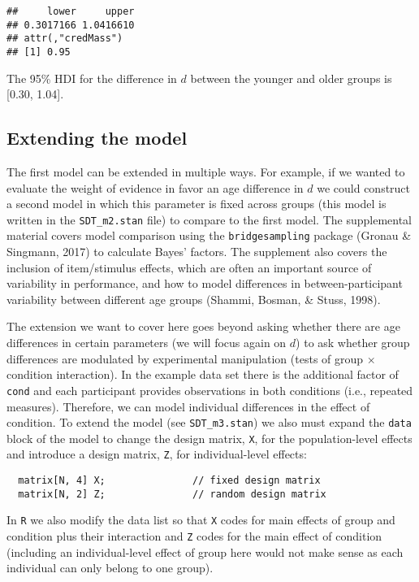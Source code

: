 \documentclass[
  english,
  ,man,floatsintext]{apa6}
\begin{document}
\begin{verbatim}
##     lower     upper 
## 0.3017166 1.0416610 
## attr(,"credMass")
## [1] 0.95
\end{verbatim}

The 95\% HDI for the difference in \(d\) between the younger and older groups is {[}0.30, 1.04{]}.

\hypertarget{extending-the-model}{%
\subsection{Extending the model}\label{extending-the-model}}

The first model can be extended in multiple ways. For example, if we wanted to evaluate the weight of evidence in favor an age difference in \(d\) we could construct a second model in which this parameter is fixed across groups (this model is written in the \texttt{SDT\_m2.stan} file) to compare to the first model. The supplemental material covers model comparison using the \texttt{bridgesampling} package (Gronau \& Singmann, 2017) to calculate Bayes' factors. The supplement also covers the inclusion of item/stimulus effects, which are often an important source of variability in performance, and how to model differences in between-participant variability between different age groups (Shammi, Bosman, \& Stuss, 1998).

The extension we want to cover here goes beyond asking whether there are age differences in certain parameters (we will focus again on \(d\)) to ask whether group differences are modulated by experimental manipulation (tests of group \(\times\) condition interaction). In the example data set there is the additional factor of \texttt{cond} and each participant provides observations in both conditions (i.e., repeated measures). Therefore, we can model individual differences in the effect of condition. To extend the model (see \texttt{SDT\_m3.stan}) we also must expand the \texttt{data} block of the model to change the design matrix, \texttt{X}, for the population-level effects and introduce a design matrix, \texttt{Z}, for individual-level effects:

\begin{verbatim}
  matrix[N, 4] X;               // fixed design matrix
  matrix[N, 2] Z;               // random design matrix
\end{verbatim}

In \texttt{R} we also modify the data list so that \texttt{X} codes for main effects of group and condition plus their interaction and \texttt{Z} codes for the main effect of condition (including an individual-level effect of group here would not make sense as each individual can only belong to one group).
\end{document}

